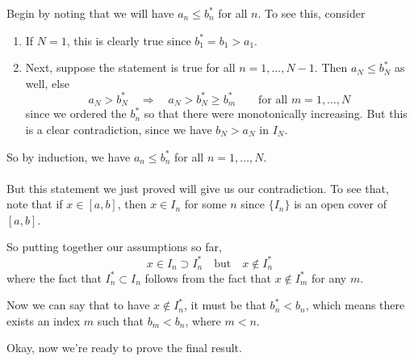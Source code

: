 \documentclass[12pt]{article}
\theoremstyle{plain}
\theoremstyle{definition}
\theoremstyle{remark}
\begin{document}
\begin{enumerate}
\begin{enumerate}
Begin by noting that we will have $a_n \leq b^*_n$ for all $n$. To see this, consider
\begin{enumerate}
    \item If $N=1$, this is clearly true since $b_1^*=b_1>a_1$.
    \item Next, suppose the statement is true for all $n=1,\ldots,N-1$. Then $a_{N}\leq b^*_{N}$ as well, else 
\[ 
    a_{N}>b^*_{N} \quad \Rightarrow \quad 
    a_{N}>b^*_{N} \geq b^*_{m} \qquad \text{for all $m=1, \ldots, N$}
\]
since we ordered the $b^*_n$ so that there were monotonically increasing. But this is a clear contradiction, since we have $b_{N} > a_{N}$ in $I_{N}$.
\end{enumerate}
So by induction, we have $a_n\leq b_n^*$ for all $n=1,\ldots,N$.
\\
\\
But this statement we just proved will give us our contradiction. To see that, note that if $x\in[a,b]$, then $x\in I_n$ for some $n$ since $\{I_n\}$ is an open cover of $[a,b]$. 

So putting together our assumptions so far,
\[
    x\in I_n \supset I^*_n \quad \text{but}\quad
    x\not\in I^*_n
\]
where the fact that $I^*_n\subset I_n$ follows from the fact that $x\not\in I^*_m$ for any $m$.

Now we can say that to have $x\not\in I_n^*$, it must be that $b^*_n < b_n$, which means there exists an index $m$ such that $b_m < b_n$, where $m < n$. 

\end{enumerate}

Okay, now we're ready to prove the final result.



\end{enumerate}
\end{document}
